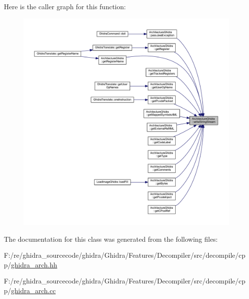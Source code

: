 Here is the caller graph for this function\+:
\nopagebreak
\begin{figure}[H]
\begin{center}
\leavevmode
\includegraphics[width=350pt]{class_architecture_ghidra_a438f8405f19893ac1aa3057f67188f4a_icgraph}
\end{center}
\end{figure}


The documentation for this class was generated from the following files\+:\begin{DoxyCompactItemize}
\item 
F\+:/re/ghidra\+\_\+sourcecode/ghidra/\+Ghidra/\+Features/\+Decompiler/src/decompile/cpp/\mbox{\hyperlink{ghidra__arch_8hh}{ghidra\+\_\+arch.\+hh}}\item 
F\+:/re/ghidra\+\_\+sourcecode/ghidra/\+Ghidra/\+Features/\+Decompiler/src/decompile/cpp/\mbox{\hyperlink{ghidra__arch_8cc}{ghidra\+\_\+arch.\+cc}}\end{DoxyCompactItemize}
